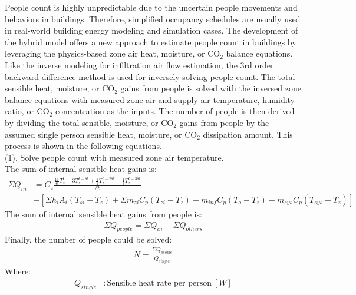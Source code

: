 People count is highly unpredictable due to the uncertain people movements and behaviors in buildings. Therefore, simplified occupancy schedules are usually used in real-world building energy modeling and simulation cases. The development of the hybrid model offers a new approach to estimate people count in buildings by leveraging the physics-based zone air heat, moisture, or CO$_2$ balance equations. Like the inverse modeling for infiltration air flow estimation, the 3rd order backward difference method is used for inversely solving people count. The total sensible heat, moisture, or CO$_2$ gains from people is solved with the inversed zone balance equations with measured zone air and supply air temperature, humidity ratio, or CO$_2$ concentration as the inputs. The number of people is then derived by dividing the total sensible, moisture, or CO$_2$ gains from people by the assumed single person sensible heat, moisture, or CO$_2$ dissipation amount. This process is shown in the following equations. \\

\noindent(1). Solve people count with measured zone air temperature. \\
\noindent The sum of internal sensible heat gains is:
\begin{align}
  \Sigma{Q_{in}} &= C_z\frac {\frac{11}{6}T_{z}^{t}-3T_{z}^{t-\delta t}+\frac{3}{2}T_{z}^{t-2\delta t}-\frac{1}{3}T_{z}^{t-3\delta t}} {\delta t} \nonumber \\
  &-  [\Sigma{h_i A_i (T_{si}-T_z)} + \Sigma{\dot{m}_{zi}C_p(T_{zi}-T_z)} + \dot{m}_{inf}C_p(T_o - T_z) + \dot{m}_{sys}C_p(T_{sys} - T_z)]
\end{align}
The sum of internal sensible heat gains from people is:
\begin{align}
  \Sigma{Q_{people}} = \Sigma{Q_{in}} - \Sigma{Q_{others}}
\end{align}
Finally, the number of people could be solved:
\begin{align}
  N = \frac {\Sigma{Q_{people}}}{Q_{single}}
\end{align}
Where:
\begin{align}
  Q_{single} &: \text{Sensible heat rate per person} ~ [W] \nonumber \\
\end{align}

